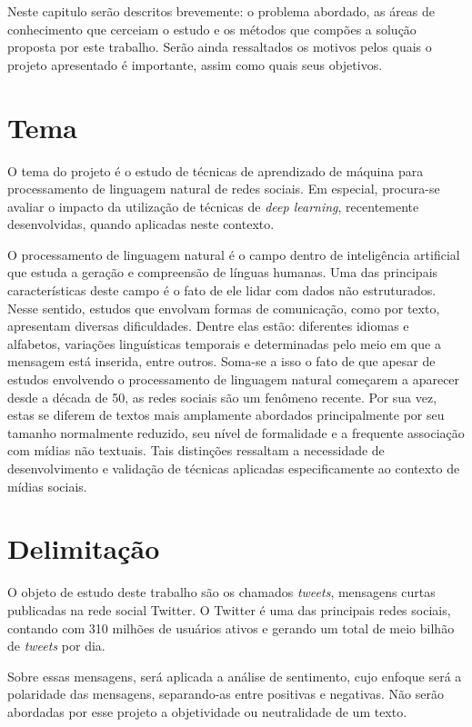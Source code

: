Neste capitulo serão descritos brevemente: o problema abordado, as áreas de conhecimento que cerceiam o estudo e os
métodos que compões a solução proposta por este trabalho.
Serão ainda ressaltados os motivos pelos quais o projeto apresentado é importante, assim como quais seus objetivos.

\section{Tema}

O tema do projeto é o estudo de técnicas de aprendizado de máquina para processamento de linguagem natural de redes
sociais.
Em especial, procura-se avaliar o impacto da utilização de técnicas de \textit{deep learning}, recentemente
desenvolvidas, quando aplicadas neste contexto.

O processamento de linguagem natural é o campo dentro de inteligência artificial que estuda a geração e compreensão de
línguas humanas.
Uma das principais características deste campo é o fato de ele lidar com dados não estruturados.
Nesse sentido, estudos que envolvam formas de comunicação, como por texto, apresentam diversas dificuldades.
Dentre elas estão: diferentes idiomas e alfabetos, variações linguísticas temporais e determinadas pelo meio em que a
mensagem está inserida, entre outros.
Soma-se a isso o fato de que apesar de estudos envolvendo o processamento de linguagem natural começarem a aparecer
desde a década de 50, as redes sociais são um fenômeno recente.
Por sua vez, estas se diferem de textos mais amplamente abordados principalmente por seu tamanho normalmente reduzido,
seu nível de formalidade e a frequente associação com mídias não textuais.
Tais distinções ressaltam a necessidade de desenvolvimento e validação de técnicas aplicadas especificamente ao contexto
de mídias sociais.

\section{Delimitação}

O objeto de estudo deste trabalho são os chamados \textit{tweets}, mensagens curtas publicadas na rede social Twitter.
O Twitter é uma das principais redes sociais, contando com 310 milhões de usuários ativos e gerando um total de meio
bilhão de \textit{tweets} por dia.

Sobre essas mensagens, será aplicada a análise de sentimento, cujo enfoque será a polaridade das mensagens,
separando-as entre positivas e negativas.
Não serão abordadas por esse projeto a objetividade ou neutralidade de um texto.

